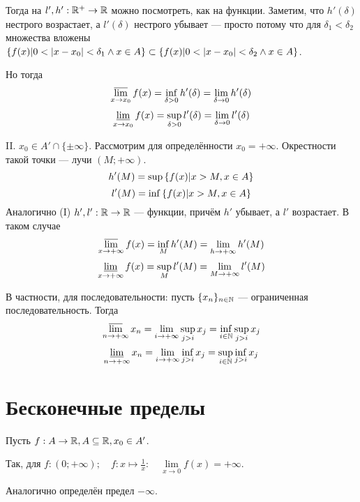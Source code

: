 \documentclass[a4paper]{report}
\begin{document}
{{            Тогда на $l', h' : \mathbb{R}^+ \rightarrow \mathbb{R}$ можно посмотреть, как на функции. Заметим, что $h'(\delta)$ нестрого возрастает, а $l'(\delta)$ нестрого убывает --- просто потому что для $\delta_1 < \delta_2$ множества вложены $\left\{f(x)\middle|0 < |x - x_0| < \delta_1 \land x \in A\right\} \subset \left\{f(x)\middle|0 < |x - x_0| < \delta_2 \land x \in A\right\}$.

            Но тогда \[\varlimsup\limits_{x \to x_0}f(x) = \inf\limits_{\delta > 0}h'(\delta) = \lim\limits_{\delta \to 0}h'(\delta)\]\[\varliminf\limits_{x \to x_0}f(x) = \sup\limits_{\delta > 0}l'(\delta) = \lim\limits_{\delta \to 0}l'(\delta)\]

            \item[II.] $x_0 \in A' \cap \{\pm\infty\}$. Рассмотрим для определённости $x_0 = +\infty$. Окрестности такой точки --- лучи $(M; +\infty)$.
            \[h'(M) = \sup\left\{f(x)\middle|x > M, x \in A\right\}\]
            \[l'(M) = \inf\left\{f(x)\middle|x > M, x \in A\right\}\]
            Аналогично (I) $h', l' : \mathbb{R} \rightarrow \mathbb{R}$ --- функции, причём $h'$ убывает, а $l'$ возрастает.
            В таком случае \[\varlimsup\limits_{x \to +\infty}f(x) = \inf_M h'(M) = \lim\limits_{h \to +\infty}{h'(M)}\] \[\varliminf\limits_{x \to +\infty}f(x) = \sup_M l'(M) = \lim\limits_{M \to +\infty}{l'(M)}\]
        }
        В частности, для последовательности: пусть $\{x_n\}_{n \in \mathbb{N}}$ --- ограниченная последовательность. Тогда \[\varlimsup\limits_{n \to +\infty}x_n = \lim\limits_{i \to +\infty}\sup\limits_{j > i}x_j = \inf_{i \in \mathbb{N}}\sup\limits_{j > i}x_j\]
        \[\varliminf\limits_{n \to +\infty}x_n = \lim\limits_{i \to +\infty}\inf\limits_{j > i}x_j = \sup\limits_{i \in \mathbb{N}}\inf\limits_{j > i}x_j\]
    }



    \section{Бесконечные пределы}
    Пусть $f: A \rightarrow \mathbb{R}, A \subseteq \mathbb{R}, x_0 \in A'$.
    \definition[Предел $+\infty$]{
        $f$ имеет предел $+\infty$  в точке $x_0$, если
        \[\forall \U{+\infty} : \exists \V{x_0} : \forall x \in \V{x_0} : f(x) \in \U{+\infty}]\]
    }

    Так, для $f : (0; +\infty); \quad f : x \mapsto \frac{1}{x} : \quad \lim\limits_{x \to 0}f(x) = +\infty$.

    Аналогично определён предел $-\infty$.
\end{document}
